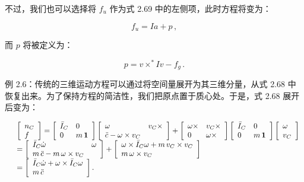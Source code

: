 \documentclass[10pt,a4paper]{book}
\theoremstyle{thmstyle} %
\theoremstyle{defstyle} %
\theoremstyle{prostyle} %
\begin{document}
不过，我们也可以选择将 $f_{u}$ 作为式 2.69 中的左侧项，此时方程将变为：



$$
f _ { u } = I a + p \, ,
$$



而 $p$ 将被定义为：



$$
p = v \times ^{*} I v - f _ { g } \, .
$$



例 2.6：传统的三维运动方程可以通过将空间量展开为其三维分量，从式 2.68 中恢复出来。为了保持方程的简洁性，我们把原点置于质心处。于是，式 2.68 展开后变为：



$$
\begin{array}{rl} & { \left[ \begin{array}{l} { n _ { C } } \\{ f } \end{array} \right] = \left[ \begin{array}{ll} { \bar { I } _ { C } } & { 0 } \\{ 0 } & { m \, { \bf 1 } } \end{array} \right] \left[ \begin{array}{ll} { \omega } & { v _ { C } \times } \\{ \ddot { c } - \omega \times v _ { C } } \end{array} \right] + \left[ \begin{array}{ll} { \omega \times } & { v _ { C } \times } \\{ 0 } & { \omega \times } \end{array} \right] \left[ \begin{array}{ll} { \bar { I } _ { C } } & { 0 } \\{ 0 } & { m \, { \bf 1 } } \end{array} \right] \left[ \begin{array}{l} { \omega } \\{ v _ { C } } \end{array} \right] } \\& { = \left[ \begin{array}{ll} { \bar { I } _ { C } \dot { \omega } } & { \omega } \\{ m \, \ddot { c } - m \, \omega \times v _ { C } } \end{array} \right] + \left[ \begin{array}{ll} { \omega \times \bar { I } _ { C } \omega + m \, v _ { C } \times v _ { C } } \\{ m \, \omega \times v _ { C } } \end{array} \right] } \\& { = \left[ \begin{array}{l} { \bar { I } _ { C } \dot { \omega } + \omega \times \bar { I } _ { C } \omega } \\{ m \, \ddot { c } } \end{array} \right] . } \end{array}
$$
\end{document}
